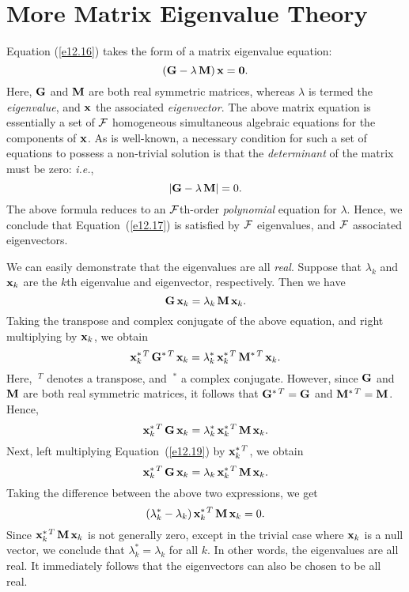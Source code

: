 \section{More Matrix Eigenvalue Theory}\label{smat2}
Equation (\ref{e12.16}) takes the form of a matrix eigenvalue equation:
\begin{equation}\label{e12.17}
({\bf G} - \lambda\,{\bf M})\,\bf{x} = {\bf 0}.
\end{equation}
Here, ${\bf G}$ and ${\bf M}$ are both real symmetric matrices, whereas
$\lambda$ is  termed the {\em eigenvalue}, and ${\bf x}$ the associated {\em eigenvector}. 
The above matrix equation is essentially a set of ${\cal F}$ homogeneous simultaneous algebraic equations for the components of ${\bf x}$. As is well-known, a necessary condition for such a set of equations to possess a
non-trivial solution is that the {\em determinant}\/ of the matrix must
be zero: {\em i.e.}, 
\begin{equation}
|{\bf G} -\lambda\,{\bf M}| = 0.
\end{equation}
The above formula reduces to an ${\cal F}$th-order {\em polynomial}\/ equation
for $\lambda$. Hence, we conclude that Equation~(\ref{e12.17}) is satisfied
by ${\cal F}$ eigenvalues, and ${\cal F}$ associated eigenvectors.

We can easily demonstrate that the eigenvalues are all {\em real}. Suppose
that $\lambda_k$ and ${\bf x}_k$ are the $k$th eigenvalue and
eigenvector, respectively. Then we have
\begin{equation}\label{e12.19}
{\bf G}\,{\bf x}_k = \lambda_k\,{\bf M}\,{\bf x}_k.
\end{equation}
Taking the transpose and complex conjugate of the above equation, and
right multiplying by ${\bf x}_k$, we obtain
\begin{equation}
{\bf x}_k^{\ast\,T}\,{\bf G}^{\ast\,T}\,{\bf x}_k = \lambda_k^\ast\,
{\bf x}_k^{\ast\,T}\,{\bf M}^{\ast\,T}\,{\bf x}_k.
\end{equation}
Here, $~^T$ denotes a transpose, and $~^\ast$ a complex conjugate.
However, since ${\bf G}$ and ${\bf M}$ are both real symmetric
matrices, it follows that ${\bf G}^{\ast\,T} = {\bf G}$ and ${\bf M}^{\ast\,T}={\bf M}$. Hence,
\begin{equation}
{\bf x}_k^{\ast\,T}\,{\bf G}\,{\bf x}_k = \lambda_k^\ast\,
{\bf x}_k^{\ast\,T}\,{\bf M}\,{\bf x}_k.
\end{equation}
Next, left multiplying Equation~(\ref{e12.19}) by ${\bf x}_k^{\ast\,T}$,
we obtain
\begin{equation}
{\bf x}_k^{\ast\,T}\,{\bf G}\,{\bf x}_k = \lambda_k\,
{\bf x}_k^{\ast\,T}\,{\bf M}\,{\bf x}_k.
\end{equation}
Taking the difference between the above two expressions, we get
\begin{equation}
(\lambda_k^\ast-\lambda_k)\,{\bf x}_k^{\ast\,T}\,{\bf M}\,{\bf x}_k = 0.
\end{equation}
Since ${\bf x}_k^{\ast\,T}\,{\bf M}\,{\bf x}_k$ is not generally zero, except in the trivial case where
${\bf x}_k$ is a null vector, we conclude that $\lambda_k^\ast = \lambda_k$
for all $k$. In other words, the eigenvalues are all real. It immediately
follows that the eigenvectors can also be chosen to be all real.

